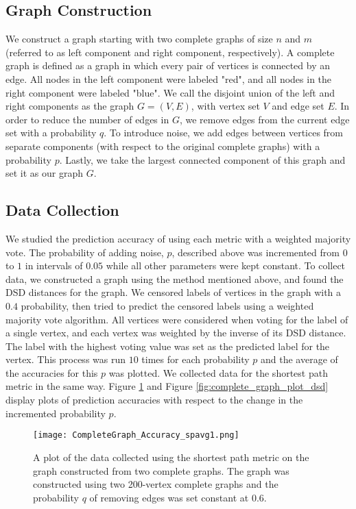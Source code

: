\subsection{Graph Construction}
We construct a graph starting with two complete graphs of size $n$ and $m$ (referred to as left component and right component, respectively). A complete graph is defined as a graph in which every pair of vertices is connected by an edge. All nodes in the left component were labeled "red", and all nodes in the right component were labeled "blue". We call the disjoint union of the left and right components as the graph $G = (V,E)$, with vertex set $V$ and edge set $E$. In order to reduce the number of edges in $G$, we remove edges from the current edge set with a probability $q$. To introduce noise, we add edges between vertices from separate components (with respect to the original complete graphs) with a probability $p$. Lastly, we take the largest connected component of this graph and set it as our graph $G$.

\subsection{Data Collection}
We studied the prediction accuracy of using each metric with a weighted majority vote. The probability of adding noise, $p$, described above was incremented from $0$ to $1$ in intervals of $0.05$ while all other parameters were kept constant. To collect data, we constructed a graph using the method mentioned above, and found the DSD distances for the graph. We censored labels of vertices in the graph with a $0.4$ probability, then tried to predict the censored labels using a weighted majority vote algorithm. All vertices were considered when voting for the label of a single vertex, and each vertex was weighted by the inverse of its DSD distance. The label with the highest voting value was set as the predicted label for the vertex. This process was run $10$ times for each probability $p$ and the average of the accuracies for this $p$ was plotted. We collected data for the shortest path metric in the same way. Figure \ref{fig:complete_graph_plot_shortest_path} and Figure \ref{fig:complete_graph_plot_dsd} display plots of prediction accuracies with respect to the change in the incremented probability $p$.

\begin{figure}[h]
\centering
\texttt{[image: CompleteGraph\_Accuracy\_spavg1.png]}
\caption{A plot of the data collected using the shortest path metric on the graph constructed from two complete graphs. The graph was constructed using two 200-vertex complete graphs and the probability $q$ of removing edges was set constant at $0.6$.}
\label{fig:complete_graph_plot_shortest_path}
\end{figure}

